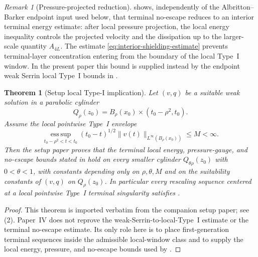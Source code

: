 \documentclass[11pt]{amsart}
\numberwithin{equation}{section}
\theoremstyle{plain}
\newtheorem{theorem}{Theorem}[section]
\theoremstyle{definition}
\theoremstyle{remark}
\newtheorem{remark}[remark]{Remark}
\newcommand{\esssup}{\operatorname*{ess\,sup}}
\begin{document}
\begin{remark}[Pressure-projected reduction]
\label{rem:narrowed-final-implication}
 shows, independently of the
Albritton--Barker endpoint input used below, that terminal no-escape reduces
to an interior terminal energy estimate: after local pressure projection, the local
energy inequality controls the projected velocity and the dissipation up to the
larger-scale quantity \(A_{4L}\).  The estimate
\eqref{eq:interior-shielding-estimate} prevents
terminal-layer concentration entering from the boundary of the local Type~I
window.  In the present paper this bound is supplied
instead by the endpoint weak Serrin local Type~I bounds in
.
\end{remark}

\begin{theorem}[Setup local Type-I implication]
\label{thm:AB-weak-serrin-typeI-estimate}
Let \((v,q)\) be a suitable weak solution in a parabolic cylinder
\[
   Q_\rho(z_0)=B_\rho(x_0)\times(t_0-\rho^2,t_0).
\]
Assume the local pointwise Type~I envelope
\[
   \esssup_{t_0-\rho^2<t<t_0}
   (t_0-t)^{1/2}\|v(t)\|_{L^\infty(B_\rho(x_0))}\le M<\infty .
\]
Then the setup paper proves that the terminal local energy, pressure-gauge,
and no-escape bounds stated in
 hold on every smaller cylinder
\(Q_{\theta\rho}(z_0)\) with \(0<\theta<1\), with constants depending only on
\(\rho,\theta,M\) and on the suitability constants of \((v,q)\) on
\(Q_\rho(z_0)\).  In particular every rescaling sequence centered at a local
pointwise Type~I terminal singularity satisfies
.
\end{theorem}

\begin{proof}
This theorem is imported verbatim from the companion setup paper; see
\,(2).  Paper~IV does not reprove the
weak-Serrin-to-local-Type~I estimate or the terminal no-escape estimate.  Its
only role here is to place first-generation terminal sequences inside the
admissible local-window class and to supply the local energy, pressure, and
no-escape bounds used by
.
\end{proof}
\end{document}
